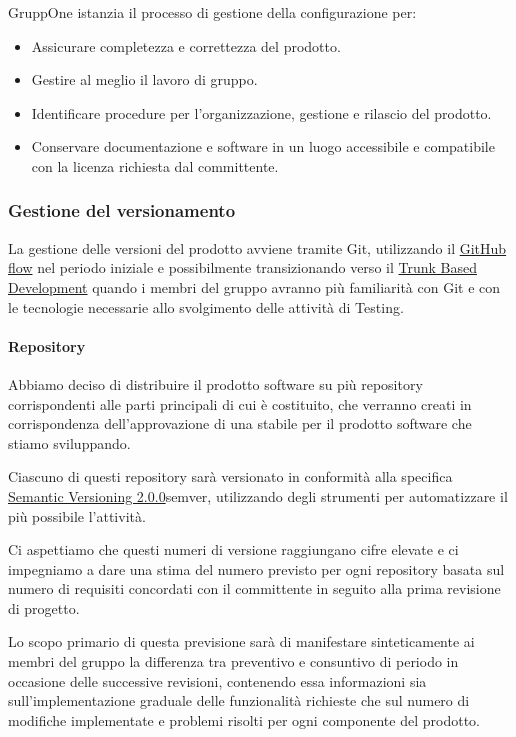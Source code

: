 \documentclass[../norme-di-progetto.tex]{subfiles}
\begin{document}
GruppOne istanzia il processo di gestione della configurazione per:
\begin{itemize}
  \item Assicurare completezza e correttezza del prodotto.
  \item Gestire al meglio il lavoro di gruppo.
  \item Identificare procedure per l'organizzazione, gestione e rilascio del prodotto.
  \item Conservare documentazione e software in un luogo accessibile e compatibile con la licenza richiesta dal committente.
\end{itemize}

\subsubsection{Gestione del versionamento}%
\label{subs:gestione_del_versionamento}

La gestione delle versioni del prodotto avviene tramite Git, utilizzando il \href{https://help.github.com/en/github/collaborating-with-issues-and-pull-requests/github-flow}{GitHub flow} nel periodo iniziale e possibilmente transizionando verso il \href{https://trunkbaseddevelopment.com/}{Trunk Based Development} quando i membri del gruppo avranno più familiarità con Git e con le tecnologie necessarie allo svolgimento delle attività di Testing.

\paragraph{Repository}%
\label{par:repository}

Abbiamo deciso di distribuire il prodotto software su più repository corrispondenti alle parti principali di cui è costituito, che verranno creati in corrispondenza dell'approvazione di una  stabile per il prodotto software che stiamo sviluppando.

Ciascuno di questi repository sarà versionato in conformità alla specifica \href{https://semver.org/spec/v2.0.0.html}{Semantic Versioning 2.0.0}{semver}, utilizzando degli strumenti per automatizzare il più possibile l'attività.

Ci aspettiamo che questi numeri di versione raggiungano cifre elevate e ci impegniamo a dare una stima del numero previsto per ogni repository basata sul numero di requisiti concordati con il committente in seguito alla prima revisione di progetto.

Lo scopo primario di questa previsione sarà di manifestare sinteticamente ai membri del gruppo la differenza tra preventivo e consuntivo di periodo in occasione delle successive revisioni, contenendo essa informazioni sia sull'implementazione graduale delle funzionalità richieste che sul numero di modifiche implementate e problemi risolti per ogni componente del prodotto.
\end{document}
